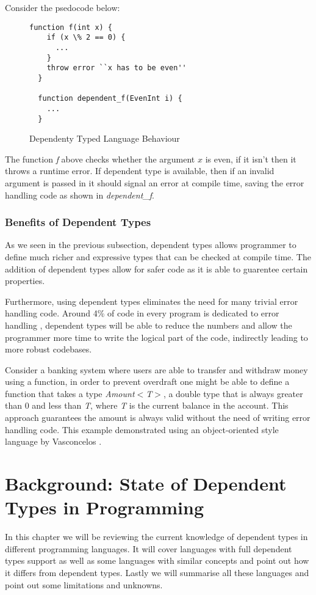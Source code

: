 \documentclass[a4paper,12pt]{report}
\begin{document}
\par
Consider the psedocode below: 
\begin{figure}[H]
  \begin{lstlisting}[mathescape=true] 
  function f(int x) {
    if (x \% 2 == 0) {
      ...
    }
    throw error ``x has to be even''
  }
  
  function dependent_f(EvenInt i) {
    ...
  }
  \end{lstlisting}
  \caption{Dependenty Typed Language Behaviour}
\end{figure}

\par
The function \textit{f} above checks whether the argument $x$ is even, if it 
isn't then it throws a runtime error. If dependent type is available, then if an 
invalid argument is passed in it should signal an error at compile time, saving the 
error handling code as shown in \textit{dependent\_f}. 

\subsection{Benefits of Dependent Types}
As we seen in the previous subsection, dependent types allows programmer to 
define much richer and expressive types that can be checked at compile time. The 
addition of dependent types allow for safer code as it is able to guarentee certain 
properties. 

\par
Furthermore, using dependent types eliminates the need for many trivial error 
handling code. Around 4\% of code in every program is dedicated to error 
handling \cite{errorHandlingCode}, dependent types will be able to reduce the 
numbers and allow the programmer more time to write the logical part of the 
code, indirectly leading to more robust codebases.

\par
Consider a banking system where users are able to transfer and withdraw 
money using a function, 
in order to prevent overdraft one might be able to define a function that takes 
a type \textit{Amount$<$T$>$}, a double type that is always 
greater than 0 and less than \textit{T}, where \textit{T} is the current balance in the account. 
This approach guarantees the amount is always valid without the need of writing 
error handling code. This example demonstrated using an object-oriented style 
language by Vasconcelos \cite{objOritentedDependentType}.


\chapter{Background: State of Dependent Types in Programming} 
In this chapter we will be reviewing the current knowledge of dependent types 
in different programming languages. It will cover languages with full dependent 
types support as well as some languages with similar concepts and point out how 
it differs from dependent types. Lastly we will summarise all these languages 
and point out some limitations and unknowns. 
\end{document}
